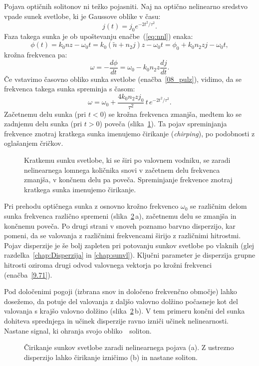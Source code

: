 Pojava optičnih solitonov ni težko pojasniti. Naj na optično nelinearno sredstvo
vpade sunek svetlobe, ki je Gaussove oblike v času:
\begin{equation}
j(t) = j_0 e^{-2t^2/\tau^2}.
\label{08_pulz}
\end{equation}
Faza takega sunka je ob upoštevanju enačbe~(\ref{eq:nnl}) enaka:
\begin{equation}
\phi (t) = k_0 n z - \omega_0 t = k_0 (\tilde{n} + n_2 j)z - \omega_0 t = 
\phi_0 + k_0 n_2 z j - \omega_0 t,
\end{equation}
krožna frekvenca pa:
\begin{equation}
\omega = -\frac{d\phi}{dt} = \omega_0 - k_0 n_2 z \frac{dj}{dt}.
\end{equation}
Če vstavimo časovno obliko sunka svetlobe (enačba~\ref{08_pulz}), vidimo, da se 
frekvenca takega sunka spreminja s časom:
\begin{equation}
\omega = \omega_0 + \frac{4k_0 n_2 z j_0}{\tau^2} \, t \, e^{-2t^2/\tau^2}.
\label{eq:chirpi}
\end{equation}
Začetnemu delu sunka (pri $t<0$) se krožna frekvenca zmanjša, medtem ko se 
zadnjemu delu sunka (pri $t>0$) poveča (slika~\ref{fig:optsoliton}). 
Ta pojav spreminjanja frekvence znotraj kratkega sunka imenujemo čirikanje
({\it chirping}),  po podobnosti z oglašanjem čričkov.

\begin{figure}[ht]
\centering
\def\svgwidth{70truemm} 

\caption{Kratkemu sunku svetlobe, ki se širi po valovnem vodniku, se zaradi nelinearnega 
lomnega količnika snovi v začetnem delu frekvenca zmanjša, v končnem delu pa poveča.
Spreminjanje frekvence znotraj kratkega sunka imenujemo čirikanje.}
\label{fig:optsoliton}
\end{figure}
Pri prehodu optičnega sunka z osnovno krožno frekvenco $\omega_0$ se različnim delom sunka
frekvenca različno spremeni (slika~\ref{fig:chirp}\,a), začetnemu delu se zmanjša in 
končnemu poveča. Po drugi strani v snoveh poznamo barvno disperzijo, 
kar pomeni, da se valovanja z različnimi frekvencami širijo z različnimi hitrostmi.
 Pojav disperzije je še bolj zapleten pri potovanju sunkov svetlobe po vlaknih
(glej razdelka~\ref{chap:Disperzija} in \ref{chap:sunvl}). Ključni parameter je disperzija 
grupne hitrosti oziroma drugi odvod valovnega vektorja po krožni frekvenci (enačba~\ref{9.71}).

Pod določenimi pogoji (izbrana snov in določeno frekvenčno območje) 
lahko dosežemo, da potuje del valovanja z daljšo valovno dolžino počasneje kot del valovanja
s krajšo valovno dolžino (slika~\ref{fig:chirp}\,b). V tem primeru končni del sunka 
dohiteva sprednjega in učinek disperzije ravno izniči učinek nelinearnosti. 
Nastane signal, ki ohranja svojo obliko~\textendash~soliton. 
\begin{figure}[ht]
\centering
\def\svgwidth{128truemm} 

\caption{Čirikanje sunkov svetlobe zaradi nelinearnega pojava (a). Z ustrezno disperzijo lahko
čirikanje izničimo (b) in nastane soliton.}
\label{fig:chirp}
\end{figure}


